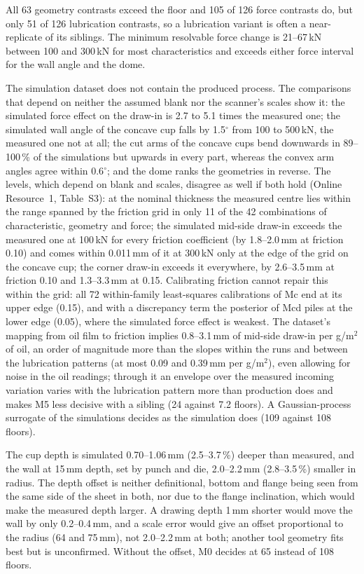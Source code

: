 \documentclass[pdflatex,sn-basic,lineno]{sn-jnl}
\newcommand{\ORt}[1]{Online Resource~1, Table~S#1}
\begin{document}
All 63 geometry contrasts exceed the floor and 105 of 126 force contrasts do, but only 51 of 126 lubrication contrasts, so a lubrication variant is often a near-replicate of its siblings. The minimum resolvable force change is 21--67\,kN between 100 and 300\,kN for most characteristics and exceeds either force interval for the wall angle and the dome.

The simulation dataset does not contain the produced process. The comparisons that depend on neither the assumed blank nor the scanner's scales show it: the simulated force effect on the draw-in is 2.7 to 5.1 times the measured one; the simulated wall angle of the concave cup falls by 1.5$^\circ$ from 100 to 500\,kN, the measured one not at all; the cut arms of the concave cups bend downwards in 89--100\,\% of the simulations but upwards in every part, whereas the convex arm angles agree within 0.6$^\circ$; and the dome ranks the geometries in reverse. The levels, which depend on blank and scales, disagree as well if both hold (\ORt{3}): at the nominal thickness the measured centre lies within the range spanned by the friction grid in only 11 of the 42 combinations of characteristic, geometry and force; the simulated mid-side draw-in exceeds the measured one at 100\,kN for every friction coefficient (by 1.8--2.0\,mm at friction 0.10) and comes within 0.011\,mm of it at 300\,kN only at the edge of the grid on the concave cup; the corner draw-in exceeds it everywhere, by 2.6--3.5\,mm at friction 0.10 and 1.3--3.3\,mm at 0.15. Calibrating friction cannot repair this within the grid: all 72 within-family least-squares calibrations of Mc end at its upper edge (0.15), and with a discrepancy term the posterior of Mcd piles at the lower edge (0.05), where the simulated force effect is weakest. The dataset's mapping from oil film to friction implies 0.8--3.1\,mm of mid-side draw-in per g/m$^2$ of oil, an order of magnitude more than the slopes within the runs and between the lubrication patterns (at most 0.09 and 0.39\,mm per g/m$^2$), even allowing for noise in the oil readings; through it an envelope over the measured incoming variation varies with the lubrication pattern more than production does and makes M5 less decisive with a sibling (24 against 7.2 floors). A Gaussian-process surrogate of the simulations decides as the simulation does (109 against 108 floors).

The cup depth is simulated 0.70--1.06\,mm (2.5--3.7\,\%) deeper than measured, and the wall at 15\,mm depth, set by punch and die, 2.0--2.2\,mm (2.8--3.5\,\%) smaller in radius. The depth offset is neither definitional, bottom and flange being seen from the same side of the sheet in both, nor due to the flange inclination, which would make the measured depth larger. A drawing depth 1\,mm shorter would move the wall by only 0.2--0.4\,mm, and a scale error would give an offset proportional to the radius (64 and 75\,mm), not 2.0--2.2\,mm at both; another tool geometry fits best but is unconfirmed. Without the offset, M0 decides at 65 instead of 108 floors.
\end{document}
